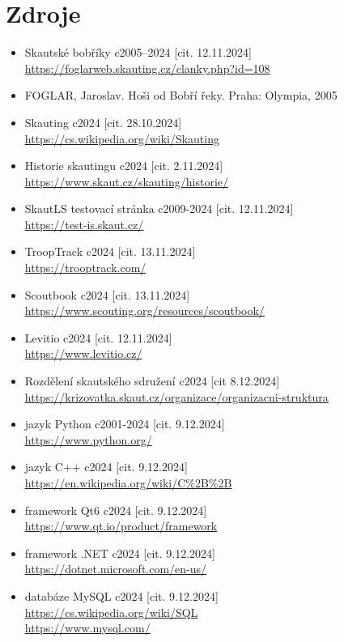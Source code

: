 \documentclass[twoside]{ctuthesis}
\begin{document}
\chapter{Zdroje}
\begin{itemize}

\item Skautské bobříky c2005–2024 [cit. 12.11.2024] \\
\url{https://foglarweb.skauting.cz/clanky.php?id=108}
\item FOGLAR, Jaroslav. Hoši od Bobří řeky. Praha: Olympia, 2005
\item Skauting c2024 [cit. 28.10.2024] \\
\url{https://cs.wikipedia.org/wiki/Skauting}
\item Historie skautingu c2024 [cit. 2.11.2024] \\
\url{https://www.skaut.cz/skauting/historie/}
\item SkautLS testovací stránka c2009-2024 [cit. 12.11.2024] \\
\url{https://test-is.skaut.cz/}
\item TroopTrack c2024 [cit. 13.11.2024] \\
\url{https://trooptrack.com/}
\item Scoutbook c2024 [cit. 13.11.2024] \\
\url{https://www.scouting.org/resources/scoutbook/}
\item Levitio c2024 [cit. 12.11.2024] \\
\url{https://www.levitio.cz/}
\item Rozdělení skautského sdružení c2024 [cit 8.12.2024] \\
\url{https://krizovatka.skaut.cz/organizace/organizacni-struktura}
\item jazyk Python c2001-2024 [cit. 9.12.2024] \\
\url{https://www.python.org/}
\item jazyk C++ c2024 [cit. 9.12.2024] \\
\url{https://en.wikipedia.org/wiki/C%2B%2B}
\item framework Qt6 c2024 [cit. 9.12.2024] \\
\url{https://www.qt.io/product/framework}
\item framework .NET c2024 [cit. 9.12.2024] \\
\url{https://dotnet.microsoft.com/en-us/}
\item databáze MySQL c2024 [cit. 9.12.2024] \\
\url{https://cs.wikipedia.org/wiki/SQL} \\
\url{https://www.mysql.com/}


\end{itemize}
\end{document}

